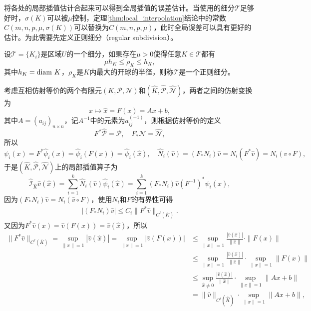 \documentclass[a4paper,10pt]{ctexart}
\begin{document}
将各处的局部插值估计合起来可以得到全局插值的误差估计。当使用的细分$ \mathcal{T} $足够好时，$ \sigma(K) $可以被$ \mu $控制，定理\ref{thm:local_interpolation}结论中的常数$ C(m,n,p,\mu,\sigma(K)) $可以替换为$ C(m,n,p,\mu) $，此时全局误差可以具有更好的估计。为此需要先定义正则细分（regular subdivision）。
\begin{definition}
    设$ \mathcal{T}=\{K_i\} $是区域$ U $的一个细分，如果存在$ \mu>0 $使得任意$ K\in \mathcal{T} $都有
    \begin{equation}
        \mu h_K \leqslant \rho_K \leqslant h_K,
    \end{equation}
    其中$ h_K = {\rm diam}\ K $，$ \rho_K $是$ K $内最大的开球的半径，则称$ \mathcal{T} $是一个正则细分。
\end{definition}

考虑互相仿射等价的两个有限元$ (K,\mathcal{P},\mathcal{N}) $和$ (\hat{K},\hat{\mathcal{P}},\hat{\mathcal{N}}) $，两者之间的仿射变换为
\[
    x\mapsto \hat{x} = F(x) = Ax+b,
\]
其中$ A = (a_{ij})_{n\times n} $，记$ A^{-1} $中的元素为$ a^{(-1)}_{ij} $，则根据仿射等价的定义
\[
    F^*\hat{\mathcal{P}} = \mathcal{P},\quad F_*\mathcal{N} = \hat{\mathcal{N}},
\]
所以
\[
    \psi_i(x) = F^* \hat{\psi}_i(x)= \hat{\psi}_i(F(x)) = \hat{\psi}_i(\hat{x}),\quad \hat{N}_i(\hat{v}) = (F_*N_i)\hat{v} = N_i(F^*\hat{v}) = N_i(\hat{v}\circ F),
\]
于是$ (\hat{K},\hat{\mathcal{P}},\hat{\mathcal{N}}) $上的局部插值算子为
\[
    \hat{\mathcal{I}}_{\hat{K}}\hat{v}(\hat{x}) = \sum_{i=1}^k \hat{N}_i(\hat{v})\hat{\psi}_i(\hat{x}) = \sum_{i=1}^k (F_*N_i)\hat{v}(F^{-1})^*\psi_i(\hat{x}),
\]
因为$ (F_*N_i)\hat{v} = N_i(\hat{v}\circ F) $，使用$ N_i $和$ F $的有界性可得
\[
    \begin{aligned}
        |(F_*N_i)\hat{v}|\leqslant C_i \| F^* \hat{v} \|_{C^\ell(\overline{K})}.
    \end{aligned}
\]
又因为$ F^*\hat{v}(x) = \hat{v}(F(x)) = \hat{v}(\hat{x}) $，所以
\[
    \begin{aligned}
        \| F^* \hat{v} \|_{C^\ell(\overline{K})} = \sup_{\| x \|=1} |\hat{v}(\hat{x})|
        = \sup_{\| x \|=1} |\hat{v}(F(x))|
        &\leqslant \sup_{\| x \|=1} \frac{|\hat{v}(\hat{x})|}{\| \hat{x} \| }\cdot \| F(x) \|\\
        &\leqslant \sup_{\| x \|=1} \frac{|\hat{v}(\hat{x})|}{\| \hat{x} \| }\cdot \sup_{\| x \|=1} \| F(x) \|\\
        &\leqslant \sup_{\hat{x}\ne 0} \frac{|\hat{v}(\hat{x})|}{\| \hat{x} \| } \cdot \sup_{\| x \|=1} \| Ax+b \|\\
        &= \| \hat{v} \|_{C^\ell(\overline{\hat{K}})}\cdot \sup_{\| x \|=1} \| Ax+b \|,
    \end{aligned}
\]
\end{document}
